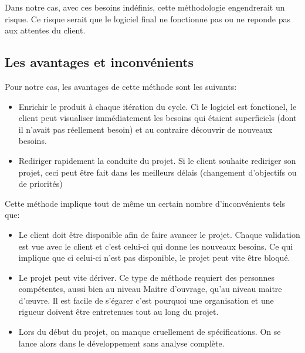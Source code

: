 Dans notre cas, avec ces besoins indéfinis, cette méthodologie engendrerait un risque. Ce risque serait que le logiciel final ne fonctionne pas ou ne reponde pas aux attentes du client.

\subsection{Les avantages et inconvénients}
Pour notre cas, les avantages de cette méthode sont les suivants:
\begin{itemize}
    \item Enrichir le produit à chaque itération du cycle. Ci le logiciel est fonctionel, le client peut visualiser immédiatement les besoins qui étaient superficiels (dont il n'avait pas réellement besoin) et au contraire découvrir de nouveaux besoins.
    \item Rediriger rapidement la conduite du projet. Si le client souhaite rediriger son projet, ceci peut être fait dans les meilleurs délais (changement d'objectifs ou de priorités)
\end{itemize}\medskip
 
Cette méthode implique tout de même un certain nombre d'inconvénients tels que:
\begin{itemize}
    \item Le client doit être disponible afin de faire avancer le projet. Chaque validation est vue avec le client et c'est celui-ci qui donne les nouveaux besoins. Ce qui implique que ci celui-ci n'est pas disponible, le projet peut vite être bloqué. 
    \item Le projet peut vite dériver. Ce type de méthode requiert des personnes compétentes, aussi bien au niveau Maitre d'ouvrage, qu'au niveau maitre d'œuvre. Il est facile de s'égarer c'est pourquoi une organisation et une rigueur doivent être entretenues tout au long du projet.
    \item Lors du début du projet, on manque cruellement de spécifications. On se lance alors dans le développement sans analyse complète.    
\end{itemize}\medskip







    
